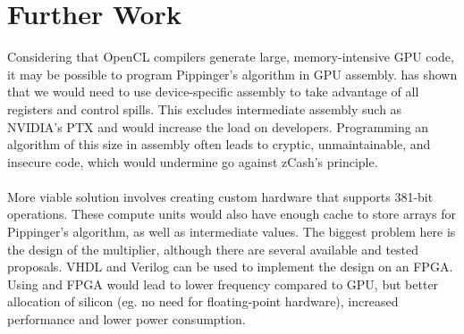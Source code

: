 
\chapter{Further Work} %

\label{Chapter8} %


Considering that OpenCL compilers generate large, memory-intensive GPU code, it may be possible to program Pippinger's algorithm in GPU assembly. \cite{bernstein2010ecc2k} has shown that we would need to use device-specific assembly to take advantage of all registers and control spills. This excludes intermediate assembly such as NVIDIA's PTX and would increase the load on developers. Programming an algorithm of this size in assembly often leads to cryptic, unmaintainable, and insecure code, which would undermine go against zCash's principle.\\
\\
More viable solution involves creating custom hardware that supports 381-bit operations. These compute units would also have enough cache to store arrays for Pippinger's algorithm, as well as intermediate values. The biggest problem here is the design of the multiplier, although there are several available and tested proposals\cite{brinci2015efficient, quan2005high}. VHDL and Verilog can be used to implement the design on an FPGA. Using and FPGA would lead to lower frequency compared to GPU, but better allocation of silicon (eg. no need for floating-point hardware), increased performance and lower power consumption.